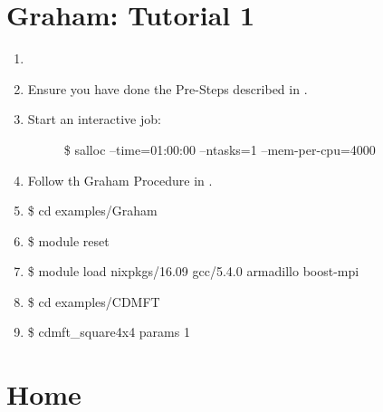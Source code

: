 \documentclass[letterpaper,10pt,english]{sphinxmanual}
\begin{document}
\section{Graham: Tutorial 1}
\label{\detokenize{tutorial:graham-tutorial-1}}\begin{enumerate}
\item {} 

\item {} 
Ensure you have done the Pre-Steps described in {\hyperref[\detokenize{installation:installation}]{}}.

\item {} \begin{description}
\item[{Start an interactive job:}] \leavevmode
\$ salloc  --time=01:00:00 --ntasks=1 --mem-per-cpu=4000

\end{description}

\item {} 
Follow th Graham Procedure in {\hyperref[\detokenize{installation:installation}]{}}.

\item {} 
\$ cd examples/Graham

\item {} 
\$ module reset

\item {} 
\$ module load nixpkgs/16.09  gcc/5.4.0 armadillo boost-mpi

\item {} 
\$ cd examples/CDMFT

\item {} 
\$ cdmft\_square4x4 params 1

\end{enumerate}


\section{Home}
\label{\detokenize{tutorial:home}}
\end{document}
